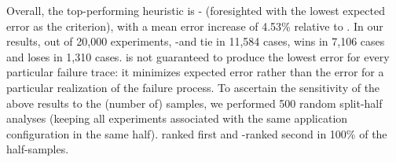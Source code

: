 Overall, the top-performing heuristic is \foresighted-\expectederror
(foresighted with the lowest expected error as the criterion), with a mean error increase
of 4.53\% relative to \dynamic. In our results, out of 20,000 experiments, 
\foresighted-\expectederror and \dynamic tie in 11,584 cases, \dynamic
wins in 7,106 cases and loses in 1,310 cases. 
\dynamic is not guaranteed
to produce the lowest error for every particular failure trace: it
minimizes expected error rather than the error for a particular realization
of the failure process. 
To ascertain the sensitivity of the above results to the
(number of) samples, we performed 500 random split-half analyses (keeping
all experiments associated with the same application configuration in the
same half). \dynamic ranked first and \foresighted-\expectederror ranked second
in 100\% of the half-samples.



